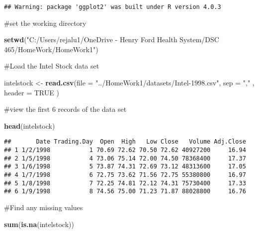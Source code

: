 \documentclass[
]{article}
\newenvironment{Shaded}{\begin{snugshade}}{\end{snugshade}}
\newcommand{\DataTypeTok}[1]{\textcolor[rgb]{0.13,0.29,0.53}{#1}}
\newcommand{\KeywordTok}[1]{\textcolor[rgb]{0.13,0.29,0.53}{\textbf{#1}}}
\newcommand{\NormalTok}[1]{#1}
\newcommand{\OtherTok}[1]{\textcolor[rgb]{0.56,0.35,0.01}{#1}}
\newcommand{\StringTok}[1]{\textcolor[rgb]{0.31,0.60,0.02}{#1}}
\begin{document}
\begin{verbatim}
## Warning: package 'ggplot2' was built under R version 4.0.3
\end{verbatim}

\#set the working directory

\begin{Shaded}
\begin{Highlighting}[]
\KeywordTok{setwd}\NormalTok{(}\StringTok{"C:/Users/rejalu1/OneDrive - Henry Ford Health System/DSC 465/HomeWork/HomeWork1"}\NormalTok{)}
\end{Highlighting}
\end{Shaded}

\#Load the Intel Stock data set

\begin{Shaded}
\begin{Highlighting}[]
\NormalTok{intelstock <-}\StringTok{ }\KeywordTok{read.csv}\NormalTok{(}\DataTypeTok{file =} \StringTok{"../HomeWork1/datasets/Intel-1998.csv"}\NormalTok{, }\DataTypeTok{sep =} \StringTok{","}\NormalTok{ , }\DataTypeTok{header =} \OtherTok{TRUE}\NormalTok{ )}
\end{Highlighting}
\end{Shaded}

\#view the first 6 records of the data set

\begin{Shaded}
\begin{Highlighting}[]
\KeywordTok{head}\NormalTok{(intelstock)}
\end{Highlighting}
\end{Shaded}

\begin{verbatim}
##       Date Trading.Day  Open  High   Low Close   Volume Adj.Close
## 1 1/2/1998           1 70.69 72.62 70.50 72.62 40927200     16.94
## 2 1/5/1998           4 73.06 75.14 72.00 74.50 78368400     17.37
## 3 1/6/1998           5 73.87 74.31 72.69 73.12 48313600     17.05
## 4 1/7/1998           6 72.75 73.62 71.56 72.75 55380800     16.97
## 5 1/8/1998           7 72.25 74.81 72.12 74.31 75730400     17.33
## 6 1/9/1998           8 74.56 75.00 71.23 71.87 88028800     16.76
\end{verbatim}

\#Find any missing values

\begin{Shaded}
\begin{Highlighting}[]
\KeywordTok{sum}\NormalTok{(}\KeywordTok{is.na}\NormalTok{(intelstock))}
\end{Highlighting}
\end{Shaded}
\end{document}
